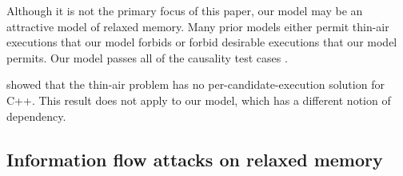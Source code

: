 Although it is not the primary focus of this paper, our model may be an
attractive model of relaxed memory.  Many prior models either permit
thin-air executions that our model forbids or forbid desirable executions
that our model permits.
Our model passes all of the causality test cases
\cite{PughWebsite}.

\citet{DBLP:conf/esop/BattyMNPS15} showed that the thin-air problem has
no per-candidate-execution solution for C++.  This result does not apply to
our model, which has a different notion of dependency.

\subsection{Information flow attacks on relaxed memory}
\label{sec:info-flow-attack}

